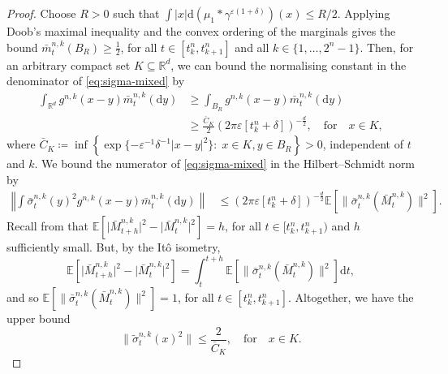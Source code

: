 \documentclass[12pt,oneside]{amsart}
\theoremstyle{definition}
\newcommand{\D}{\mathrm{d}}
\newcommand{\R}{\mathbb R}
\def\E{{\mathbb E}}
\def\R{{\mathbb R}}
\numberwithin{equation}{section}
\begin{document}
\begin{proof}		 
	 Choose $R > 0$ such that $\int |x| \D(\mu_1 \ast \gamma^{\varepsilon(1+\delta)})(x) \leq R/2$. Applying Doob's maximal inequality and the convex ordering of the marginals gives the bound $\bar{m}^{n, k}_t(B_R) \geq \frac{1}{2}$, for all $t \in [t^n_k, t^n_{k + 1}]$ and all $k \in \{1, \dotsc, 2^n - 1\}$. Then, for an arbitrary compact set $K \subseteq \R^d$, we can bound the normalising constant in the denominator of \eqref{eq:sigma-mixed} by
	 \begin{equation}\label{eq:denominator-bound}
	 	\begin{split}
		 	\int_{\R^d} g^{n, k}(x - y)\bar{m}^{n, k}_t(\D y) & \geq \int_{B_R} g^{n, k}(x - y)\bar{m}^{n, k}_t(\D y)\\
		 	& \geq \frac{\bar{C}_K}{2}(2 \pi \varepsilon [t^n_k + \delta])^{-\frac{d}{2}}, \quad \text{for} \quad x \in K,
	 	\end{split}
	 \end{equation}
	 where $\bar{C}_K \coloneqq \inf \!\left\{\exp \{- \varepsilon^{-1} \delta^{-1} \lvert x - y \rvert^2 \} \colon \; x \in K, y \in B_R\right\}\! > 0$, independent of $t$ and $k$. We bound the numerator of \eqref{eq:sigma-mixed} in the Hilbert--Schmidt norm by
	 \begin{equation}
	 	\begin{split}
	 		\!\left \Vert \int \bar \sigma^{n, k}_t(y)^2 g^{n, k}(x - y) \bar{m}^{n, k}_t(\D y)\right \rVert & \leq (2 \pi \varepsilon [t^n_k + \delta])^{-\frac{d}{2}} \E [\lVert \bar{\sigma}^{n, k}_t(\bar{M}^{n, k}_t)\rVert^2].
	 	\end{split}
	 \end{equation}
	 Recall from  that $\E[\lvert \bar{M}^{n, k}_{t + h}\rvert^2 - \lvert \bar{M}^{n, k}_{t}\rvert^2] = h$, for all $t \in [t^n_k, t^n_{k + 1})$ and $h$ sufficiently small. But, by the It\^o isometry,
	 \begin{equation}
	 	\E[\lvert \bar{M}^{n, k}_{t + h}\rvert^2 - \lvert \bar{M}^{n, k}_{t}\rvert^2] = \int_t^{t + h} \E [\lVert \bar{\sigma}^{n, k}_t(\bar{M}^{n, k}_t)\rVert^2] \D t,
	 \end{equation}
	 and so $\E [\lVert \bar{\sigma}^{n, k}_t(\bar{M}^{n, k}_t)\rVert^2] = 1$, for all $t \in [t^n_k, t^n_{k +1}]$. Altogether, we have the upper bound
	 \begin{equation}
	 	\lVert \tilde \sigma^{n, k}_t(x)^2 \rVert \leq \frac{2}{\bar{C}_K}, \quad \text{for} \quad x \in K.
	 \end{equation}
	 

\end{proof}
\end{document}
